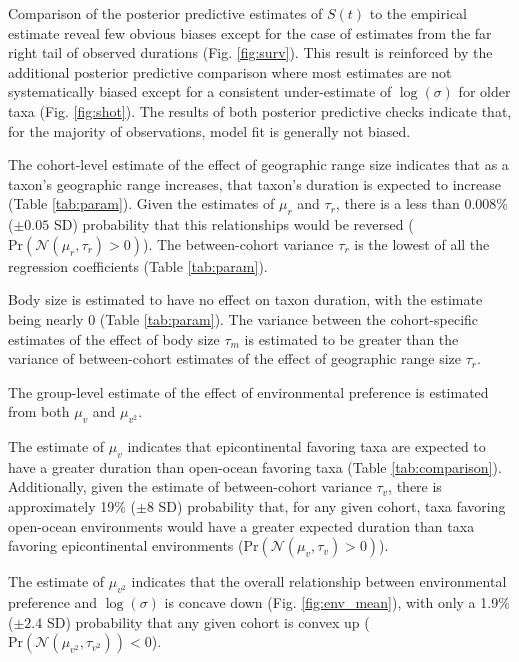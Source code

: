\documentclass{article}
\begin{document}
Comparison of the posterior predictive estimates of \(S(t)\) to the empirical estimate reveal few obvious biases except for the case of estimates from the far right tail of observed durations (Fig. \ref{fig:surv}). This result is reinforced by the additional posterior predictive comparison where most estimates are not systematically biased except for a consistent under-estimate of \(\log(\sigma)\) for older taxa (Fig. \ref{fig:shot}). The results of both posterior predictive checks indicate that, for the majority of observations, model fit is generally not biased.

The cohort-level estimate of the effect of geographic range size indicates that as a taxon's geographic range increases, that taxon's duration is expected to increase (Table \ref{tab:param}). Given the estimates of \(\mu_{r}\) and \(\tau_{r}\), there is a less than 0.008\% (\(\pm 0.05\) SD) probability that this relationships would be reversed (\(\mathrm{Pr}\left(\mathcal{N}(\mu_{r}, \tau_{r}) > 0\right)\)). The between-cohort variance \(\tau_{r}\) is the lowest of all the regression coefficients (Table \ref{tab:param}).

Body size is estimated to have no effect on taxon duration, with the estimate being nearly 0 (Table \ref{tab:param}). The variance between the cohort-specific estimates of the effect of body size \(\tau_{m}\) is estimated to be greater than the variance of between-cohort estimates of the effect of geographic range size \(\tau_{r}\). 

The group-level estimate of the effect of environmental preference is estimated from both \(\mu_{v}\) and \(\mu_{v^{2}}\). 

The estimate of \(\mu_{v}\) indicates that epicontinental favoring taxa are expected to have a greater duration than open-ocean favoring taxa (Table \ref{tab:comparison}). Additionally, given the estimate of between-cohort variance \(\tau_{v}\), there is approximately 19\% (\(\pm 8\) SD) probability that, for any given cohort, taxa favoring open-ocean environments would have a greater expected duration than taxa favoring epicontinental environments (\(\mathrm{Pr}\left(\mathcal{N}(\mu_{v}, \tau_{v}) > 0 \right)\)). 

The estimate of \(\mu_{v^{2}}\) indicates that the overall relationship between environmental preference and \(\log(\sigma)\) is concave down (Fig. \ref{fig:env_mean}), with only a 1.9\% (\(\pm 2.4\) SD) probability that any given cohort is convex up (\(\mathrm{Pr}\left(\mathcal{N}(\mu_{v^{2}}, \tau_{v^{2}})\right) < 0\)).
\end{document}
